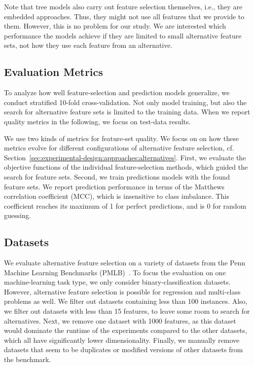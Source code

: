 \documentclass{article}
\theoremstyle{definition}
\begin{document}
Note that tree models also carry out feature selection themselves, i.e., they are embedded approaches.
Thus, they might not use all features that we provide to them.
However, this is no problem for our study.
We are interested which performance the models achieve if they are limited to small alternative feature sets, not how they use each feature from an alternative.

\subsection{Evaluation Metrics}
\label{sec:experimental-design:evaluation}

To analyze how well feature-selection and prediction models generalize, we conduct stratified 10-fold cross-validation.
Not only model training, but also the search for alternative feature sets is limited to the training data.
When we report quality metrics in the following, we focus on test-data results.

We use two kinds of metrics for feature-set quality.
We focus on on how these metrics evolve for different configurations of alternative feature selection, cf. Section~\ref{sec:experimental-design:approaches:alternatives}.
First, we evaluate the objective functions of the individual feature-selection methods, which guided the search for feature sets.
Second, we train predictions models with the found feature sets.
We report prediction performance in terms of the Matthews correlation coefficient (MCC), which is insensitive to class imbalance.
This coefficient reaches its maximum of 1 for perfect predictions, and is 0 for random guessing.

\subsection{Datasets}
\label{sec:experimental-design:datasets}

We evaluate alternative feature selection on a variety of datasets from the Penn Machine Learning Benchmarks (PMLB)~\cite{olson2017pmlb,romano2021pmlb}.
To focus the evaluation on one machine-learning task type, we only consider binary-classification datasets.
However, alternative feature selection is possible for regression and multi-class problems as well.
We filter out datasets containing less than 100 instances.
Also, we filter out datasets with less than 15 features, to leave some room to search for alternatives.
Next, we remove one dataset with 1000 features, as this dataset would dominate the runtime of the experiments compared to the other datasets, which all have significantly lower dimensionality.
Finally, we manually remove datasets that seem to be duplicates or modified versions of other datasets from the benchmark.
\end{document}
